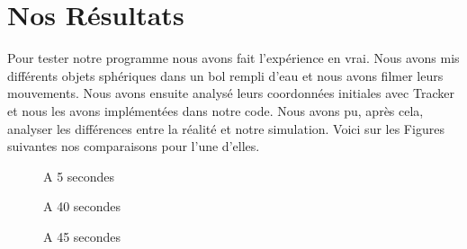 \section{Nos Résultats}
    Pour tester notre programme nous avons fait l'expérience en vrai. Nous avons mis différents objets sphériques dans un bol rempli d'eau et nous avons filmer leurs mouvements. Nous avons ensuite analysé leurs coordonnées initiales avec Tracker et nous les avons implémentées dans notre code. Nous avons pu, après cela, analyser les différences entre la réalité et notre simulation. Voici sur les Figures suivantes nos comparaisons pour l'une d'elles.


    \begin{figure}%
        \centering
        \qquad
        \caption{A 5 secondes}%
        \label{fig:example}%
    \end{figure}
    \begin{figure}%
        \centering
        \qquad
        \caption{A 40 secondes}%
        \label{fig:examplee}%
    \end{figure}
    \begin{figure}%
        \centering
        \qquad
        \caption{A 45 secondes}%
        \label{fig:examples}%
    \end{figure}
    
